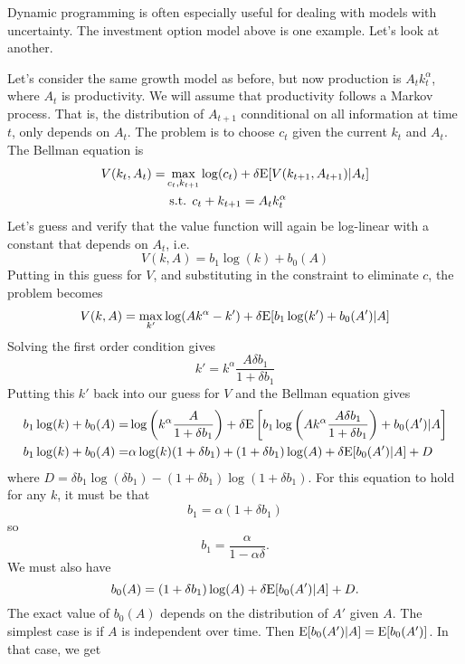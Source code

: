 Dynamic programming is often especially useful for dealing with models
with uncertainty. The investment option model above is one
example. Let's look at another.
\begin{example}
  Let's consider the same growth model as before, but now production
  is $A_t k_t^\alpha$, where $A_t$ is productivity. We will assume
  that productivity follows a Markov process. That is, the
  distribution of $A_{t+1}$ connditional on all information at time
  $t$, only depends on $A_t$. The problem is to choose $c_t$ given the
  current $k_t$ and $A_t$. The Bellman equation is
  \begin{align*}
    V(k_t, A_t) = & \max_{c_t, k_{t+1}} \log (c_t) + \delta
                    \mathrm{E}[V(k_{t+1}, A_{t+1}) | A_t] \\
                  & \text{ s.t. } c_t + k_{t+1} = A_t k_t^\alpha 
  \end{align*}
  Let's guess and verify that the value function will again be
  log-linear with a constant that depends on $A_t$, i.e.
  \[ V(k,A) = b_1 \log(k) + b_0(A) \]
  Putting in this guess for $V$, and substituting in the constraint to
  eliminate $c$, the problem becomes
  \[ V(k,A) =  \max_{k'} \log (Ak^\alpha - k') + \delta
    \mathrm{E}[b_1\log(k') + b_0(A') | A] \]
  Solving the first order condition gives
  \[ k' = k^\alpha \frac{A \delta b_1}{1+\delta b_1} \]
  Putting this $k'$ back into our guess for $V$ and the Bellman
  equation gives
  \begin{align*}
    b_1 \log(k) + b_0(A) = & \log \left(k^\alpha \frac{A}{1+\delta
                             b_1} \right) + \delta \mathrm{E}\left[
                             b_1 \log\left(A k^\alpha \frac{A \delta
                             b_1}{1+\delta b_1}\right) + b_0(A') | A
                             \right] \\
    b_1 \log(k) + b_0(A) = & \alpha \log(k) (1+\delta b_1)  + (1+\delta b_1)\log(A)
                              + \delta \mathrm{E}[b_0(A') | A] + D
  \end{align*}
  where $D = \delta b_1 \log(\delta b_1) -(1+\delta b_1)\log(1+\delta
  b_1)$. For this equation to hold for any $k$, it must be that
  \[ b_1 = \alpha (1+\delta b_1) \]
  so
  \[ b_1 = \frac{\alpha}{1-\alpha \delta}. \]
  We must also have
  \[ b_0(A) = (1+\delta b_1)\log(A) + \delta \mathrm{E}[b_0(A') | A] + D. \]
  The exact value of $b_0(A)$ depends on the distribution of $A'$
  given $A$. The simplest case is if $A$ is independent over
  time. Then $\mathrm{E}[b_0(A')|A] = \mathrm{E}[b_0(A')]$. In that case, we get

\end{example}
